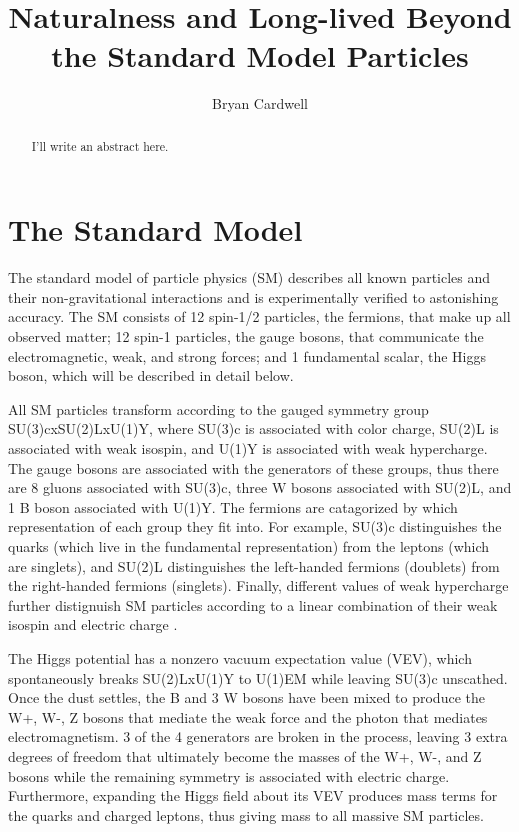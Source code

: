 \documentclass[12pt]{article}
\title{Naturalness and Long-lived Beyond the Standard Model Particles}
\author{Bryan Cardwell}
\begin{document}
\singlespacing

\maketitle

\begin{abstract}

I'll write an abstract here.

\end{abstract}

\newpage
\tableofcontents
\newpage
\doublespacing
\linenumbers

\section{The Standard Model}
    The standard model of particle physics (SM) describes all known particles and their non-gravitational interactions and is experimentally verified to astonishing  accuracy. The SM consists of 12 spin-1/2 particles, the fermions, that make up all observed matter; 12 spin-1 particles, the gauge bosons, that communicate the electromagnetic, weak, and strong forces; and 1 fundamental scalar, the Higgs boson, which will be described in detail below.
    
    All SM particles transform according to the gauged symmetry group SU(3)cxSU(2)LxU(1)Y, where SU(3)c is associated with color charge, SU(2)L is associated with weak isospin, and U(1)Y is associated with weak hypercharge. The gauge bosons are associated with the generators of these groups, thus there are 8 gluons associated with SU(3)c, three W bosons associated with SU(2)L, and 1 B boson associated with U(1)Y. The fermions are catagorized by which representation of each group they fit into. For example, SU(3)c distinguishes the quarks (which live in the fundamental representation) from the leptons (which are singlets), and SU(2)L distinguishes the left-handed fermions (doublets) from the right-handed fermions (singlets). Finally, different values of weak hypercharge further distignuish SM particles according to a linear combination of their weak isospin and electric charge .

    The Higgs potential has a nonzero vacuum expectation value (VEV), which spontaneously breaks SU(2)LxU(1)Y to U(1)EM while leaving SU(3)c unscathed. Once the dust settles, the B and 3 W bosons have been mixed to produce the W+, W-, Z bosons that mediate the weak force and the photon that mediates electromagnetism. 3 of the 4 generators are broken in the process, leaving 3 extra degrees of freedom that ultimately become the masses of the W+, W-, and Z bosons while the remaining symmetry is associated with electric charge. Furthermore, expanding the Higgs field about its VEV produces mass terms for the quarks and charged leptons, thus giving mass to all massive SM particles. 
\end{document}
